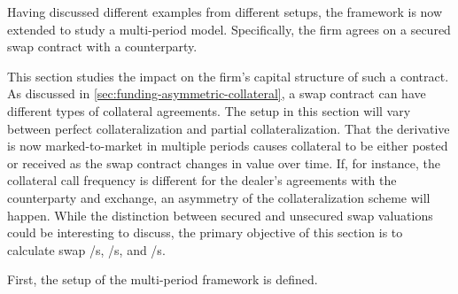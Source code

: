 \documentclass[main.tex]{subfiles}
\begin{document}
    Having discussed different examples from different setups,
    the framework is now extended to study a multi-period model.
    Specifically, the firm agrees on a secured swap contract with a counterparty.
    
    This section studies the impact on the firm's capital structure of such a contract.
    As discussed in \cref{sec:funding-asymmetric-collateral}, a swap contract can have different types of collateral agreements.
    The setup in this section will vary between perfect collateralization and partial collateralization.
    That the derivative is now marked-to-market in multiple periods causes collateral to be either posted or received as the swap contract changes in value over time.
    If, for instance, the collateral call frequency is different for the dealer's agreements with the counterparty and exchange, an asymmetry of the collateralization scheme will happen.
    While the distinction between secured and unsecured swap valuations could be interesting to discuss,
    the primary objective of this section is to calculate swap \FVA/s, \CVA/s, and \DVA/s.

    First, the setup of the multi-period framework is defined.

\end{document}
